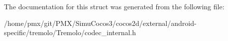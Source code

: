 The documentation for this struct was generated from the following file\+:\begin{DoxyCompactItemize}
\item 
/home/pmx/git/\+P\+M\+X/\+Simu\+Cocos3/cocos2d/external/android-\/specific/tremolo/\+Tremolo/codec\+\_\+internal.\+h\end{DoxyCompactItemize}
